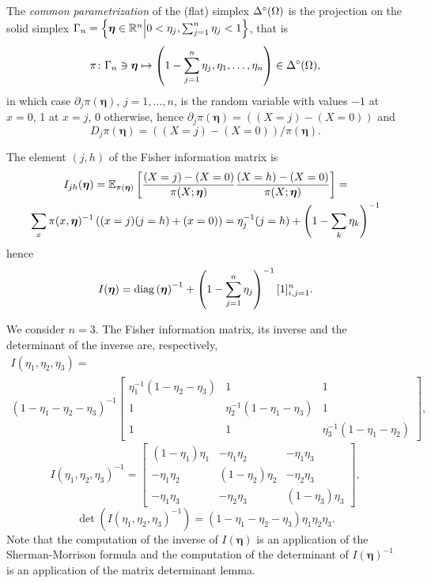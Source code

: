 \documentclass[12pt,a4paper]{amsart}
\begin{document}
The \emph{common parametrization} of the (flat) simplex $\Delta^\circ(\Omega)$ is the projection on the solid simplex $\Gamma_n = \left\{ \bm\eta \in \mathbb R^n \middle| 0<\eta_j,  \sum_{j=1}^n \eta_j< 1 \right\}$, that is
\begin{equation*}
  \pi \colon \Gamma_n \ni \bm\eta \mapsto \left(1 - \sum_{j=1}^n \eta_j,\eta_1,\dots,\eta_n\right) \in \Delta^\circ(\Omega),
\end{equation*}
in which case $\partial_j \pi(\bm\eta)$, $j=1,\dots,n$, is the random variable with values $-1$ at $x=0$, 1 at $x=j$, 0 otherwise, hence $\partial_j \pi(\bm \eta) = \left((X=j)-(X=0)\right)$ and
\begin{equation*}
  D_j \pi(\bm \eta) = \left((X=j)-(X=0)\right)/\pi(\bm\eta).
\end{equation*}

The element $(j,h)$ of the Fisher information matrix is
%
\begin{multline*}
  I_{jh}(\bm\eta)= {\operatorname{\mathbb E}}_{\pi(\bm\eta)}\left[\frac{(X=j)-(X=0)}{\pi(X;\bm\eta)}\frac{(X=h)-(X=0)}{\pi(X;\bm\eta)}\right] = \\  \sum_x \pi(x,\bm\eta)^{-1}\left((x=j)(j=h)+(x = 0)\right) = \eta_j^{-1}(j=h) + \left(1 - \sum_k \eta_k\right)^{-1}
\end{multline*}
hence
%
\begin{equation*}
  I(\bm\eta) = \operatorname{diag}\left(\bm\eta\right)^{-1}  + \left(1 - \sum_{j=1}^n \eta_j\right)^{-1}[1]_{i,j=1}^n.
\end{equation*}

\begin{example}
We consider $n=3$.  The Fisher information matrix, its inverse and the determinant of the inverse are, respectively,
\begin{multline*}
 I(\eta_1,\eta_2,\eta_3)  = \\ (1 - \eta_1 - \eta_2-\eta_3)^{-1}
  \begin{bmatrix}
\eta_1^{-1}(1 - \eta_2-\eta_3) & 1 &1 \\ 1 & \eta_2^{-1}(1 - \eta_1-\eta_3) & 1 \\  1 &1& \eta_3^{-1}(1 - \eta_1-\eta_2)
  \end{bmatrix},
\end{multline*}
%
\begin{equation*}
I(\eta_1,\eta_2,\eta_3)^{-1}  =
  \begin{bmatrix}
(1 - \eta_{1}) \eta_{1} & -\eta_{1} \eta_{2} & -\eta_{1} \eta_{3}
\\
-\eta_{1} \eta_{2} & (1 - \eta_{2}) \eta_{2} & -\eta_{2} \eta_{3}
\\
-\eta_{1} \eta_{3} &  -\eta_{2} \eta_{3} & (1 - \eta_{3}) \eta_{3}
  \end{bmatrix}, 
\end{equation*}
%
\begin{equation*}
\det\left(I(\eta_1,\eta_2,\eta_3)^{-1} \right) = (1-\eta_1- \eta_2- \eta_3)\eta_1 \eta_2 \eta_3.
\end{equation*}
% 
Note that the computation of the inverse of $I(\bm\eta)$ is an application of the Sherman-Morrison formula and the computation of the determinant of $I(\bm\eta)^{-1}$ is an application of the matrix determinant lemma.
\end{example}
\end{document}
